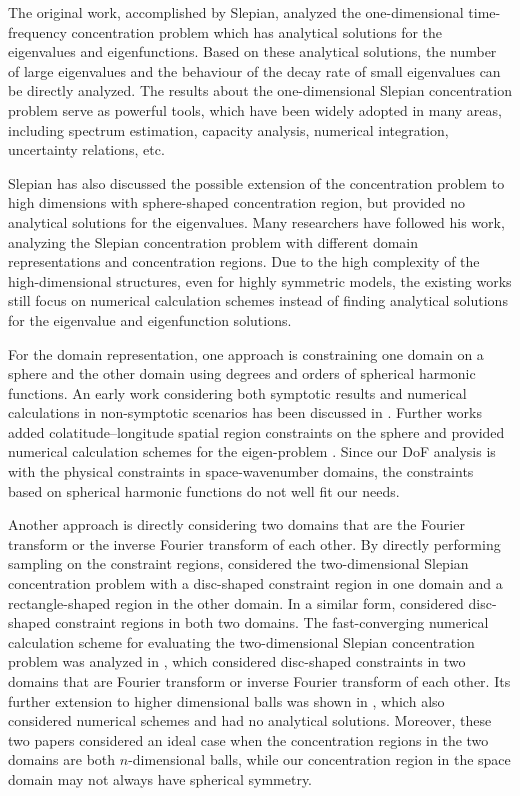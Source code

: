 \documentclass[12pt,draftclsnofoot,journal,onecolumn]{IEEEtran}
\begin{document}
	{\color{red}
	The original work, accomplished by Slepian, analyzed the one-dimensional time-frequency concentration problem which has analytical solutions for the eigenvalues and eigenfunctions\cite{slepian1961prolate}. Based on these analytical solutions, the number of large eigenvalues and the behaviour of the decay rate of small eigenvalues can be directly analyzed. The results about the one-dimensional Slepian concentration problem serve as powerful tools, which have been widely adopted in many areas, including spectrum estimation\cite{thomson2005spectrum}, capacity analysis\cite{cover1999elements}, numerical integration\cite{xiao2001prolate}, uncertainty relations\cite{furrer2014position}, etc.
	
	Slepian has also discussed the possible extension of the concentration problem to high dimensions with sphere-shaped concentration region\cite{slepian1964prolate}, but provided no analytical solutions for the eigenvalues. Many researchers have followed his work, analyzing the Slepian concentration problem with different domain representations and concentration regions. Due to the high complexity of the high-dimensional structures, even for highly symmetric models, the existing works still focus on numerical calculation schemes instead of finding analytical solutions for the eigenvalue and eigenfunction solutions. 

	For the domain representation, one approach is constraining one domain on a sphere and the other domain using degrees and orders of spherical harmonic functions. An early work considering both symptotic results and numerical calculations in non-symptotic scenarios has been discussed in \cite{simons2006spatiospectral}. Further works added colatitude–longitude spatial region constraints on the sphere and provided numerical calculation schemes for the eigen-problem \cite{bates2016slepian}. Since our DoF analysis is with the physical constraints in space-wavenumber domains, the constraints based on spherical harmonic functions do not well fit our needs. 
	
	Another approach is directly considering two domains that are the Fourier transform or the inverse Fourier transform of each other. By directly performing sampling on the constraint regions, \cite{beylkin2007grids} considered the two-dimensional Slepian concentration problem with a disc-shaped constraint region in one domain and a rectangle-shaped region in the other domain. In a similar form, \cite{simons2011spatiospectral} considered disc-shaped constraint regions in both two domains. 
	The fast-converging numerical calculation scheme for evaluating the two-dimensional Slepian concentration problem was analyzed in \cite{shkolnisky2007prolate}, which considered disc-shaped constraints in two domains that are Fourier transform or inverse Fourier transform of each other. 
	Its further extension to higher dimensional balls was shown in \cite{zhang2020ball}, which also considered numerical schemes and had no analytical solutions. Moreover, these two papers considered an ideal case when the concentration regions in the two domains are both $n$-dimensional balls, while our concentration region in the space domain may not always have spherical symmetry. 

}
\end{document}

